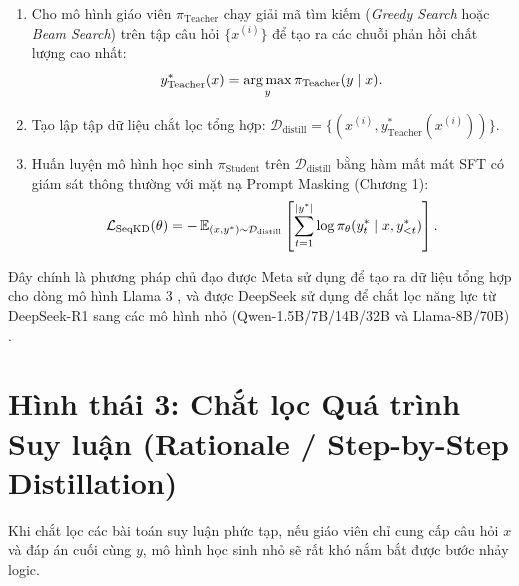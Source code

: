 \begin{definition}
\begin{enumerate}[leftmargin=1.2cm]
    \item Cho mô hình giáo viên $\pi_{\text{Teacher}}$ chạy giải mã tìm kiếm (\textit{Greedy Search} hoặc \textit{Beam Search}) trên tập câu hỏi $\{x^{(i)}\}$ để tạo ra các chuỗi phản hồi chất lượng cao nhất:
    \begin{equation}
        y_{\text{Teacher}}^*(x) = \operatorname*{arg\,max}_{y} \pi_{\text{Teacher}}(y \mid x).
    \end{equation}
    \item Tạo lập tập dữ liệu chắt lọc tổng hợp: $\mathcal{D}_{\text{distill}} = \{(x^{(i)}, y_{\text{Teacher}}^*(x^{(i)}))\}$.
    \item Huấn luyện mô hình học sinh $\pi_{\text{Student}}$ trên $\mathcal{D}_{\text{distill}}$ bằng hàm mất mát SFT có giám sát thông thường với mặt nạ Prompt Masking (Chương 1):
    \begin{equation}
        \mathcal{L}_{\text{SeqKD}}(\theta) = -\operatorname{\mathbb{E}}_{(x, y^*) \sim \mathcal{D}_{\text{distill}}} \left[ \sum_{t=1}^{|y^*|} \log \pi_\theta(y_t^* \mid x, y_{<t}^*) \right].
    \end{equation}
\end{enumerate}
\end{definition}

Đây chính là phương pháp chủ đạo được Meta sử dụng để tạo ra dữ liệu tổng hợp cho dòng mô hình Llama 3 \citep{dubey2024llama}, và được DeepSeek sử dụng để chắt lọc năng lực từ DeepSeek-R1 sang các mô hình nhỏ (Qwen-1.5B/7B/14B/32B và Llama-8B/70B) \citep{deepseek2025r1}.

\section{Hình thái 3: Chắt lọc Quá trình Suy luận (Rationale / Step-by-Step Distillation)}
\label{sec:rationale_distillation}

Khi chắt lọc các bài toán suy luận phức tạp, nếu giáo viên chỉ cung cấp câu hỏi $x$ và đáp án cuối cùng $y$, mô hình học sinh nhỏ sẽ rất khó nắm bắt được bước nhảy logic.

